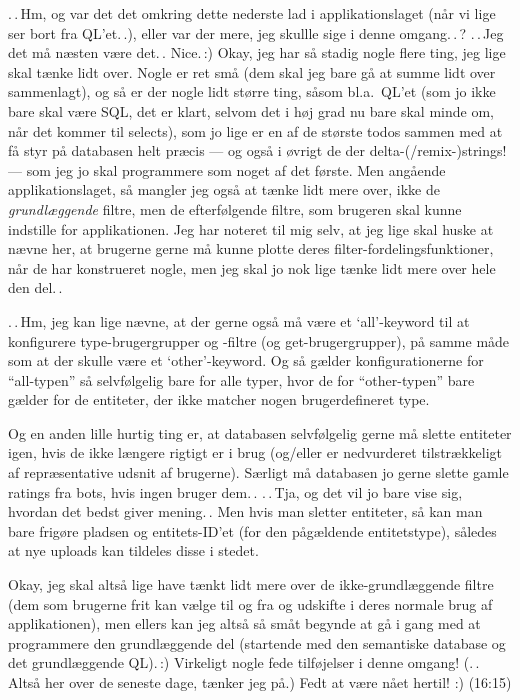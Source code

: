 \documentclass{report}
\begin{document}
.\,.\,Hm, og var det det omkring dette nederste lad i applikationslaget (når vi lige ser bort fra QL'et.\,.), eller var der mere, jeg skullle sige i denne omgang.\,.\,? .\,.\,Jeg det må næsten være det.\,. Nice.\,:) Okay, jeg har så stadig nogle flere ting, jeg lige skal tænke lidt over. Nogle er ret små (dem skal jeg bare gå at summe lidt over sammenlagt), og så er der nogle lidt større ting, såsom bl.a.\ QL'et (som jo ikke bare skal være SQL, det er klart, selvom det i høj grad nu bare skal minde om, når det kommer til selects), som jo lige er en af de største todos sammen med at få styr på databasen helt præcis --- og også i øvrigt de der delta-(/remix-)strings! --- som jeg jo skal programmere som noget af det første. Men angående applikationslaget, så mangler jeg også at tænke lidt mere over, ikke de \emph{grundlæggende} filtre, men de efterfølgende filtre, som brugeren skal kunne indstille for applikationen. Jeg har noteret til mig selv, at jeg lige skal huske at nævne her, at brugerne gerne må kunne plotte deres filter-fordelingsfunktioner, når de har konstrueret nogle, men jeg skal jo nok lige tænke lidt mere over hele den del.\,. 

.\,.\,Hm, jeg kan lige nævne, at der gerne også må være et `all'-keyword til at konfigurere type-brugergrupper og -filtre (og get-brugergrupper), på samme måde som at der skulle være et `other'-keyword. Og så gælder konfigurationerne for ``all-typen'' så selvfølgelig bare for alle typer, hvor de for ``other-typen'' bare gælder for de entiteter, der ikke matcher nogen brugerdefineret type. 

Og en anden lille hurtig ting er, at databasen selvfølgelig gerne må slette entiteter igen, hvis de ikke længere rigtigt er i brug (og/eller er nedvurderet tilstrækkeligt af repræsentative udsnit af brugerne). Særligt må databasen jo gerne slette gamle ratings fra bots, hvis ingen bruger dem.\,. .\,.\,Tja, og det vil jo bare vise sig, hvordan det bedst giver mening.\,. Men hvis man sletter entiteter, så kan man bare frigøre pladsen og entitets-ID'et (for den pågældende entitetstype), således at nye uploads kan tildeles disse i stedet. 

Okay, jeg skal altså lige have tænkt lidt mere over de ikke-grundlæggende filtre (dem som brugerne frit kan vælge til og fra og udskifte i deres normale brug af applikationen), men ellers kan jeg altså så småt begynde at gå i gang med at programmere den grundlæggende del (startende med den semantiske database og det grundlæggende QL).\,:) Virkeligt nogle fede tilføjelser i denne omgang! (.\,.\,Altså her over de seneste dage, tænker jeg på.) Fedt at være nået hertil! :) (16:15)
\end{document}
